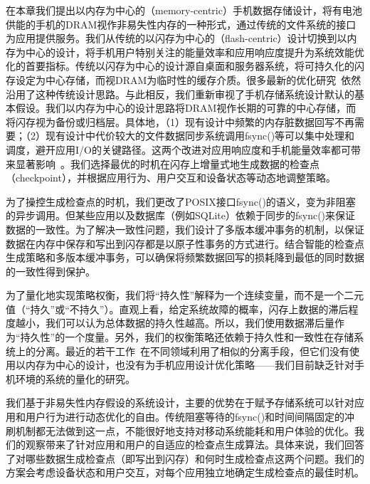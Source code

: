 在本章我们提出以内存为中心的（memory-centric）手机数据存储设计，将有电池供能的手机的DRAM视作非易失性内存的一种形式，通过传统的文件系统的接口为应用提供服务。我们从传统的以闪存为中心的（flash-centric）设计切换到以内存为中心的设计，将手机用户特别关注的能量效率和应用响应度提升为系统效能优化的首要指标。传统以闪存为中心的设计源自桌面和服务器系统，将可持久化的闪存设定为中心存储，而视DRAM为临时性的缓存介质。很多最新的优化研究~\cite{Jeong:2013:ISO:2535461.2535499, 6558430, Kim:2014:RJJ:2591305.2591332,
Nguyen:2014:ISR:2638728.2638841, Nguyen:2014:SAL:2638728.2638763,
Nguyen:2013:SSE:2493432.2493505, 6986137}依然沿用了这种传统设计思路。与此相反，我们重新审视了手机存储系统设计默认的基本假设。我们以内存为中心的设计思路将DRAM视作长期的可靠的中心存储，而将闪存视为备份或归档层。具体地，（1）现有设计中频繁的内存脏数据回写不再需要；（2）现有设计中代价较大的文件数据同步系统调用fsync()等可以集中处理和调度，避开应用I/O的关键路径。这两个改进对应用响应度和手机能量效率都可带来显著影响~\cite{Desnoyers:2013:SRN:2534861.2534867,Kim:RSS:2012, Lee:2012:SLD:2380356.2380367,Nguyen:2014:ISR:2638728.2638841}。我们选择最优的时机在闪存上增量式地生成数据的检查点（checkpoint），并根据应用行为、用户交互和设备状态等动态地调整策略。

为了操控生成检查点的时机，我们更改了POSIX接口fsync()的语义，变为非阻塞的异步调用。但某些应用以及数据库（例如SQLite）依赖于同步的fsync()来保证数据的一致性。为了解决一致性问题，我们设计了多版本缓冲事务的机制，以保证数据在内存中保存和写出到闪存都是以原子性事务的方式进行。结合智能的检查点生成策略和多版本缓冲事务，可以确保将频繁数据回写的损耗降到最低的同时数据的一致性得到保护。

为了量化地实现策略权衡，我们将“持久性”解释为一个连续变量，而不是一个二元值（“持久”或“不持久”）。直观上看，给定系统故障的概率，闪存上数据的滞后程度越小，我们可以认为总体数据的持久性越高。所以，我们使用数据滞后量作为“持久性”的一个度量。另外，我们的权衡策略还依赖于持久性和一致性在存储系统上的分离。最近的若干工作~\cite{Chidambaram:2013:OCC:2517349.2522726,
Mickens:2014:BFC:2616448.2616473}在不同领域利用了相似的分离手段，但它们没有使用以内存为中心的设计，也没有为手机应用设计优化策略——我们目前缺乏针对手机环境的系统的量化的研究。

我们基于非易失性内存假设的系统设计，主要的优势在于赋予存储系统可以针对应用和用户行为进行动态优化的自由。传统阻塞等待的fsync()和时间间隔固定的冲刷机制都无法做到这一点，不能很好地支持对移动系统能耗和用户体验的优化。我们的观察带来了针对应用和用户的自适应的检查点生成算法。具体来说，我们回答了对哪些数据生成检查点（即写出到闪存）和何时生成检查点这两个问题。我们的方案会考虑设备状态和用户交互，对每个应用独立地确定生成检查点的最佳时机。

